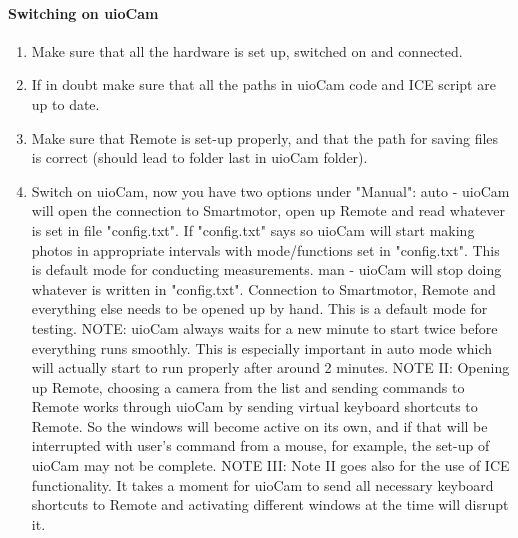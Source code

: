 \documentclass[]{book}
\begin{document}
	\paragraph{Switching on uioCam}
	\begin{enumerate}
		\item Make sure that all the hardware is set up, switched on and connected.
		\item If in doubt make sure that all the paths in uioCam code and ICE script are up to date.
		\item Make sure that Remote is set-up properly, and that the path for saving files is correct (should lead to folder last in uioCam folder).
		\item Switch on uioCam, now you have two options under "Manual":
			\subitem auto - uioCam will open the connection to Smartmotor, open up Remote and read whatever is set in file "config.txt". If "config.txt" says so uioCam will start making photos in appropriate intervals with mode/functions set in "config.txt". This is default mode for conducting measurements.
			\subitem man - uioCam will stop doing whatever is written in "config.txt". Connection to Smartmotor, Remote and everything else needs to be opened up by hand. This is a default mode for testing.
		NOTE: uioCam always waits for a new minute to start twice before everything runs smoothly. This is especially important in auto mode which will actually start to run properly after around 2 minutes.
		NOTE II: Opening up Remote, choosing a camera from the list and sending commands to Remote works through uioCam by sending virtual keyboard shortcuts to Remote. So the windows will become active on its own, and if that will be interrupted with user's command from a mouse, for example, the set-up of uioCam may not be complete.
		NOTE III: Note II goes also for the use of ICE functionality. It takes a moment for uioCam to send all necessary keyboard shortcuts to Remote and activating different windows at the time will disrupt it.
	\end{enumerate}
\end{document}

